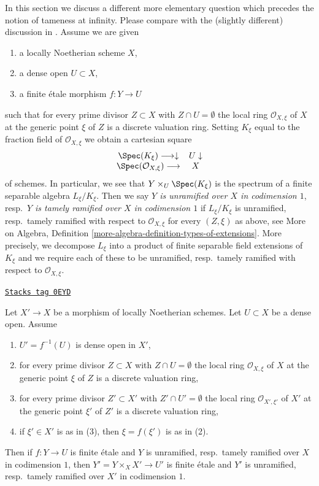 \medskip\noindent
In this section we discuss a different more elementary question which
precedes the notion of tameness at infinity.
Please compare with the (slightly different)
discussion in \cite{Grothendieck-Murre}.
Assume we are given
\begin{enumerate}
\item a locally Noetherian scheme $X$,
\item a dense open $U \subset X$,
\item a finite \'etale morphism $f : Y \to U$
\end{enumerate}
such that for every prime divisor $Z \subset X$
with $Z \cap U = \emptyset$ the local ring $\mathcal{O}_{X, \xi}$
of $X$ at the generic point $\xi$ of $Z$ is a discrete valuation ring.
Setting $K_\xi$ equal to the fraction field of $\mathcal{O}_{X, \xi}$
we obtain a cartesian square
$$
\begin{array}{cc}\Spec(K_\xi) \longrightarrow\downarrow & U \downarrow \\ \Spec(\mathcal{O}_{X, \xi}) \longrightarrow & X\end{array}
$$
of schemes. In particular, we see that $Y \times_U \Spec(K_\xi)$
is the spectrum of a finite separable algebra $L_\xi/K_\xi$.
Then we say
{\it $Y$ is unramified over $X$ in codimension $1$},
resp.\ {\it $Y$ is tamely ramified over $X$ in codimension $1$}
if $L_\xi/K_\xi$ is unramified, resp.\ tamely ramified
with respect to $\mathcal{O}_{X, \xi}$ for every $(Z, \xi)$
as above, see More on Algebra, Definition
\ref{more-algebra-definition-types-of-extensions}.
More precisely, we decompose $L_\xi$ into a product of finite
separable field extensions of $K_\xi$ and we require each of these
to be unramified, resp.\ tamely ramified with respect to
$\mathcal{O}_{X, \xi}$.

\begin{lemma}
\label{pione-lemma-pullback-tame-codim1}
\href{https://stacks.math.columbia.edu/tag/0EYD}{\texttt{Stacks tag 0EYD}}

Let $X' \to X$ be a morphism of locally Noetherian schemes.
Let $U \subset X$ be a dense open. Assume
\begin{enumerate}
\item $U' = f^{-1}(U)$ is dense open in $X'$,
\item for every prime divisor $Z \subset X$ with $Z \cap U = \emptyset$
the local ring $\mathcal{O}_{X, \xi}$ of $X$ at the generic point $\xi$
of $Z$ is a discrete valuation ring,
\item for every prime divisor $Z' \subset X'$
with $Z' \cap U' = \emptyset$ the local ring $\mathcal{O}_{X', \xi'}$
of $X'$ at the generic point $\xi'$ of $Z'$ is a discrete valuation ring,
\item if $\xi' \in X'$ is as in (3), then $\xi = f(\xi')$ is as in (2).
\end{enumerate}
Then if $f : Y \to U$ is finite \'etale and
$Y$ is unramified, resp.\ tamely ramified over $X$
in codimension $1$, then $Y' = Y \times_X X' \to U'$ is finite \'etale
and $Y'$ is unramified, resp.\ tamely ramified over $X'$ in codimension $1$.
\end{lemma}

